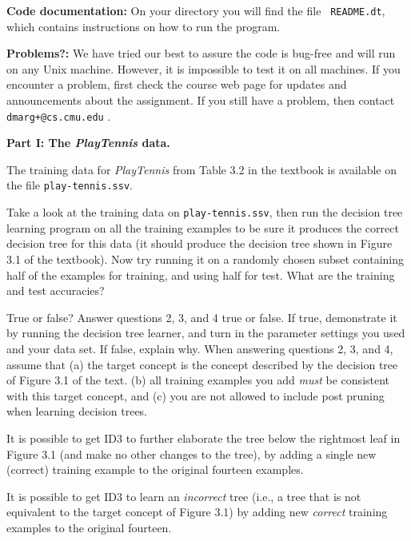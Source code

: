 \noindent
{\bf Code documentation:} On your directory you will find the file {\tt
README.dt}, which contains instructions on how to run the program.

\vspace*{.06in}

\noindent
{\bf Problems?:} We have tried our best to assure the code is bug-free and
will run on any Unix machine.  However, it is impossible to test it on all
machines.  If you encounter a problem, first check the course web page for
updates and announcements about the assignment.  If you still have a problem,
then contact {\tt dmarg+@cs.cmu.edu} .

\vspace*{.06in}

\vspace{.3in}

\noindent
{\large \bf Part I: The {\em PlayTennis} data.}

\noindent
The training data for {\em PlayTennis} from Table 3.2 in the textbook is
available on the file {\tt play-tennis.ssv}.

\be
\item
Take a look at the training data on {\tt play-tennis.ssv}, then run the
decision tree learning program on all the training examples to be sure it
produces the correct decision tree for this data (it should produce the
decision tree shown in Figure 3.1 of the textbook).  Now try running it on a
randomly chosen subset containing half of the examples for training, and using
half for test.  What are the training and test accuracies?
\ee

\noindent
True or false?  Answer questions 2, 3, and 4 true or false.  If true,
demonstrate it by running the decision tree learner, and turn in the parameter
settings you used and your data set.  If false, explain why.  When answering
questions 2, 3, and 4, assume that (a) the target concept is the concept
described by the decision tree of Figure 3.1 of the text. (b) all training
examples you add {\em must} be consistent with this target concept, and (c)
you are not allowed to include post pruning when learning decision trees.


\be
\item[2.]
It is possible to get ID3 to further elaborate the tree below the rightmost
leaf in Figure 3.1 (and make no other changes to the tree), by adding a single
new (correct) training example to the original fourteen examples.

\item[3.]
It is possible to get ID3 to learn an {\em incorrect} tree (i.e., a tree that
is not equivalent to the target concept of Figure 3.1) by adding new {\em
correct} training examples to the original fourteen.

